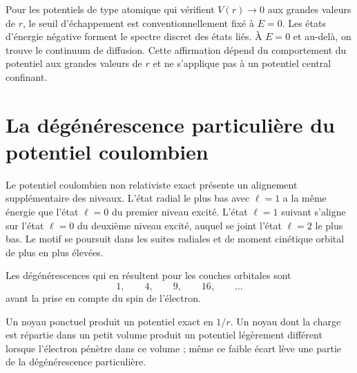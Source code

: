 Pour les potentiels de type atomique qui vérifient \(V(r)\to0\) aux grandes valeurs de \(r\), le seuil d’échappement est conventionnellement fixé à \(E=0\). Les états d’énergie négative forment le spectre discret des états liés. À \(E=0\) et au-delà, on trouve le continuum de diffusion. Cette affirmation dépend du comportement du potentiel aux grandes valeurs de \(r\) et ne s’applique pas à un potentiel central confinant.

\section{La dégénérescence particulière du potentiel coulombien}

Le potentiel coulombien non relativiste exact présente un alignement supplémentaire des niveaux. L’état radial le plus bas avec \(\ell=1\) a la même énergie que l’état \(\ell=0\) du premier niveau excité. L’état \(\ell=1\) suivant s’aligne sur l’état \(\ell=0\) du deuxième niveau excité, auquel se joint l’état \(\ell=2\) le plus bas. Le motif se poursuit dans les suites radiales et de moment cinétique orbital de plus en plus élevées.

\begin{classroomqa}\end{classroomqa}

Les dégénérescences qui en résultent pour les couches orbitales sont
\begin{equation}
1,\qquad 4,\qquad 9,\qquad 16,\qquad \ldots
\end{equation}
avant la prise en compte du spin de l’électron.

\begin{classroomqa}\end{classroomqa}

Un noyau ponctuel produit un potentiel exact en \(1/r\). Un noyau dont la charge est répartie dans un petit volume produit un potentiel légèrement différent lorsque l’électron pénètre dans ce volume ; même ce faible écart lève une partie de la dégénérescence particulière.

